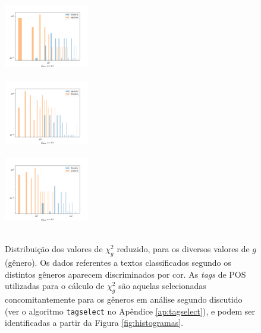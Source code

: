 \documentclass[10pt,a4paper,onecolumn]{article}
\theoremstyle{definition}
\theoremstyle{remark}
\begin{document}
\begin{figure}[htpb!]
\begin{multicols}{3}
	\end{multicols}
	\begin{multicols}{3}
		\includegraphics[width=0.33\textwidth]{graficos/histograma2_epistola_oratoria.png} \\ \vspace{0.15cm}  \\
		\includegraphics[width=0.33\textwidth]{graficos/histograma2_filosofia_epistola.png} \\ \vspace{0.15cm}  \\
		\includegraphics[width=0.33\textwidth]{graficos/histograma2_oratoria_filosofia.png} \\ \vspace{0.15cm}  \\
	\end{multicols}
	\caption{Distribuição dos valores de $\chi^2_g$ reduzido, para os diversos valores de $g$ (gênero). Os dados referentes a textos classificados segundo os distintos gêneros aparecem discriminados por cor. As \emph{tags} de POS utilizadas para o cálculo de $\chi^2_g$ são aquelas selecionadas concomitantemente para os gêneros em análise segundo discutido (ver o algoritmo \texttt{tagselect} no Apêndice \ref{ap:tagselect}), e podem ser identificadas a partir da Figura \ref{fig:histogramas}.}
	\label{fig:histogramas_chis}
\end{figure}
\end{document}
